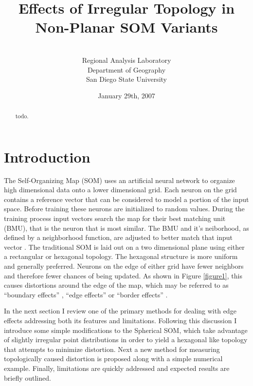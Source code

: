 \documentclass[12pt]{article}
\title{Effects of Irregular Topology in Non-Planar SOM Variants}
\author{\sc{Charles R. Schmidt}\\Regional Analysis Laboratory\\Department of Geography\\San Diego State University}
\date{January 29th, 2007}
\begin{document}
\maketitle
\begin{abstract}
todo.
\end{abstract}
\section{Introduction}
The Self-Organizing Map (SOM) uses an artificial neural network to organize high
dimensional data onto a lower dimensional grid.  Each neuron on the 
grid contains a reference vector that can be considered to model a portion of
the input space. Before training these neurons are initialized to random values.
During the training process input vectors search the map for their best matching
unit (BMU), that is the neuron that is most similar. The BMU and it's
neiborhood, as defined by a neighborhood function, are adjusted to better match
that input vector \citep{Kohonen2000}.  The traditional SOM is laid out on a two
dimensional plane using either a rectangular or hexagonal topology.  The
hexagonal structure is more uniform and generally preferred.  Neurons on the
edge of either grid have fewer neighbors and therefore fewer chances of being
updated\citep{Wu:2006lr}.  As shown in Figure \ref{figure1}, this causes
distortions around the edge of the map, which may be referred to as ``boundary
effects'' \citep{ritter99}, ``edge effects'' \citep{boudjemai2003} or  ``border
effects'' \citep{Wu:2006lr}.

In the next section I review one of the primary methods for dealing with edge
effects addressing both its features and limitations.  Following this
discussion I introduce some simple modifications to the Spherical SOM, which
take advantage of slightly irregular point distributions in order to yield a
hexagonal like topology that attempts to minimize distortion.  Next a new
method for measuring topologically caused distortion is proposed along with a
simple numerical example.  Finally, limitations are quickly addressed and
expected results are briefly outlined.
\end{document}
